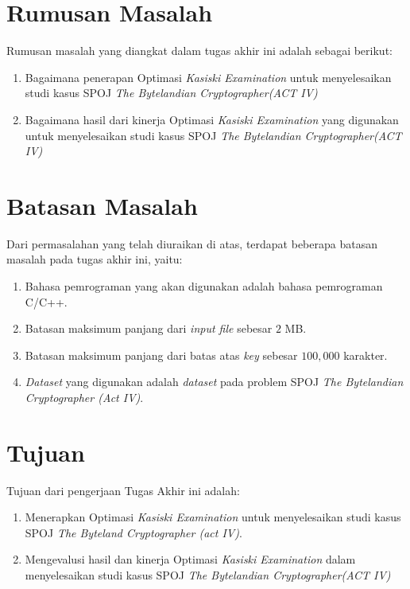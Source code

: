   \section{Rumusan Masalah}
    Rumusan masalah yang diangkat dalam tugas akhir ini adalah sebagai berikut: 
    \begin{enumerate}
      \item Bagaimana penerapan Optimasi \textit{Kasiski Examination} untuk menyelesaikan studi kasus SPOJ \textit{The Bytelandian Cryptographer(ACT IV)}
      \item Bagaimana hasil dari kinerja Optimasi \textit{Kasiski Examination} yang digunakan untuk menyelesaikan studi kasus SPOJ \textit{The Bytelandian Cryptographer(ACT IV)}
    \end{enumerate}

  \section{Batasan Masalah}
  	\label{batasan-masalah}
    Dari permasalahan yang telah diuraikan di atas, terdapat beberapa batasan masalah pada tugas akhir ini, yaitu:
    \begin{enumerate}
      \item Bahasa pemrograman yang akan digunakan adalah bahasa pemrograman C/C++.
      \item Batasan maksimum panjang dari \textit{input file} sebesar $2$ MB.	
      \item Batasan maksimum panjang dari batas atas \textit{key} sebesar $100,000$ karakter.
      \item \textit{Dataset} yang digunakan adalah \textit{dataset} pada problem SPOJ \textit{The Bytelandian Cryptographer (Act IV)}.
    \end{enumerate}

  \section{Tujuan}
  \label{tujuan}
    Tujuan dari pengerjaan Tugas Akhir ini adalah: 
    \begin{enumerate}
      \item Menerapkan Optimasi \textit{Kasiski Examination} untuk menyelesaikan studi kasus SPOJ \textit{The Byteland Cryptographer (act IV)}.
      \item Mengevalusi hasil dan kinerja Optimasi \textit{Kasiski Examination} dalam menyelesaikan studi kasus SPOJ \textit{The Bytelandian Cryptographer(ACT IV)}
    \end{enumerate}
    

